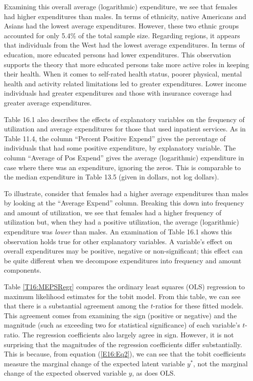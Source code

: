 Examining this overall average (logarithmic) expenditure, we see
that females had higher expenditures than males. In terms of
ethnicity, native Americans and Asians had the lowest average
expenditures. However, these two ethnic groups accounted for only
5.4\% of the total sample size. Regarding regions, it appears that
individuals from the West had the lowest average expenditures. In
terms of education, more educated persons had lower expenditures.
This observation supports the theory that more educated persons take
more active roles in keeping their health. When it comes to
self-rated health status, poorer physical, mental health and
activity related limitations led to greater expenditures. Lower
income individuals had greater expenditures and those with insurance
coverage had greater average expenditures.



Table 16.1 also describes the effects of explanatory variables on
the frequency of utilization and average expenditures for those that
used inpatient services. As in Table 11.4, the column ``Percent
Positive Expend'' gives the percentage of individuals that had some
positive expenditure, by explanatory variable. The column ``Average
of Pos Expend'' gives the average (logarithmic) expenditure in case
where there was an expenditure, ignoring the zeros. This is
comparable to the median expenditure in Table 13.5 (given in
dollars, not log dollars).


To illustrate, consider that females had a higher average
expenditures than males by looking at the ``Average Expend'' column.
Breaking this down into frequency and amount of utilization, we see
that females had a higher frequency of utilization but, when they
had a positive utilization, the average (logarithmic) expenditure
was \emph{lower} than males. An examination of Table 16.1 shows this
observation holds true for other explanatory variables. A variable's
effect on overall expenditures may be positive, negative or
non-significant; this effect can be quite different when we
decompose expenditures into frequency and amount components.


Table \ref{T16:MEPSRegr} compares the ordinary least squares (OLS)
regression to maximum likelihood estimates for the tobit model. From
this table, we can see that there is a substantial agreement among
the $t$-ratios for these fitted models. This agreement comes from
examining the sign (positive or negative) and the magnitude (such as
exceeding two for statistical significance) of each variable's
$t$-ratio. The regression coefficients also largely agree in sign.
However, it is not surprising that the magnitudes of the regression
coefficients differ substantially. This is because, from equation
(\ref{E16:Eq2}), we can see that the tobit coefficients measure the
marginal change of the expected latent variable $y^{\ast}$, not the
marginal change of the expected observed variable $y$, as does OLS.


